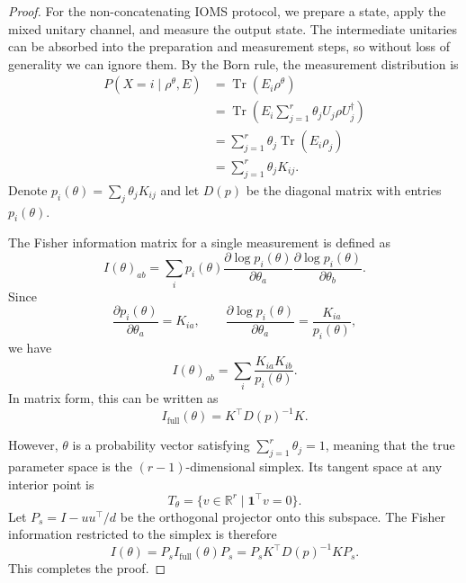 \documentclass[12pt]{article}
\begin{document}
\begin{proof}
For the non-concatenating IOMS protocol, we prepare a state, apply the mixed unitary channel, and measure the output state. The intermediate unitaries can be absorbed into the preparation and measurement steps, so without loss of generality we can ignore them. By the Born rule, the measurement distribution is
\begin{equation}\label{eq:kthetap}
\begin{split}
    P(X = i \mid \rho^\theta, E)
    &= \operatorname{Tr}(E_i \rho^\theta) \\
    &= \operatorname{Tr}\!\left(E_i \sum_{j=1}^r \theta_j U_j \rho U_j^\dagger \right) \\
    &= \sum_{j=1}^r \theta_j \operatorname{Tr}(E_i \rho_j) \\
    &= \sum_{j=1}^r \theta_j K_{ij}.
\end{split}
\end{equation}
Denote $p_i(\theta) = \sum_j \theta_j K_{ij}$ and let $D(p)$ be the diagonal matrix with entries $p_i(\theta)$.

The Fisher information matrix for a single measurement is defined as
\begin{equation}
    I(\theta)_{ab}
    = \sum_i p_i(\theta)
    \frac{\partial \log p_i(\theta)}{\partial \theta_a}
    \frac{\partial \log p_i(\theta)}{\partial \theta_b}.
\end{equation}
Since
\begin{equation}
    \frac{\partial p_i(\theta)}{\partial \theta_a} = K_{ia},
    \qquad
    \frac{\partial \log p_i(\theta)}{\partial \theta_a}
    = \frac{K_{ia}}{p_i(\theta)},
\end{equation}
we have
\begin{equation}
    I(\theta)_{ab} = \sum_i \frac{K_{ia} K_{ib}}{p_i(\theta)}.
\end{equation}
In matrix form, this can be written as
\begin{equation}
    I_{\mathrm{full}}(\theta) = K^\top D(p)^{-1} K.
\end{equation}

However, $\theta$ is a probability vector satisfying $\sum_{j=1}^r \theta_j = 1$, meaning that the true parameter space is the $(r-1)$-dimensional simplex. Its tangent space at any interior point is
\begin{equation}
    T_\theta = \{ v \in \mathbb{R}^r \mid \mathbf{1}^\top v = 0 \}.
\end{equation}
Let $P_s = I - u u^\top/d$ be the orthogonal projector onto this subspace. The Fisher information restricted to the simplex is therefore
\begin{equation}
    I(\theta) = P_s I_{\mathrm{full}}(\theta) P_s
    = P_s K^\top D(p)^{-1} K P_s.
\end{equation}
This completes the proof.
\end{proof}
\end{document}
